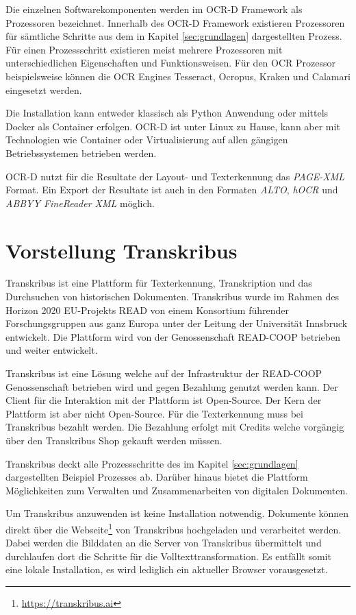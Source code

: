 \documentclass[a4paper,oneside, 12pt]{report}
\begin{document}
 Die einzelnen Softwarekomponenten werden im OCR-D Framework als Prozessoren bezeichnet. Innerhalb des OCR-D Framework existieren Prozessoren für sämtliche Schritte aus dem in Kapitel \ref{sec:grundlagen} dargestellten Prozess. Für einen Prozessschritt existieren meist mehrere Prozessoren mit unterschiedlichen Eigenschaften und Funktionsweisen. Für den \ac{OCR} Prozessor beispielsweise können die OCR Engines Tesseract, Ocropus, Kraken und Calamari eingesetzt werden. 

Die Installation kann entweder klassisch als Python Anwendung oder mittels Docker als Container erfolgen. OCR-D ist unter Linux zu Hause, kann aber mit Technologien wie Container oder Virtualisierung auf allen gängigen Betriebssystemen betrieben werden. \cite{ocrdsetup}

OCR-D nutzt für die Resultate der Layout- und Texterkennung das \textit{PAGE-XML} Format. Ein Export der Resultate ist auch in den Formaten \textit{ALTO}, \textit{hOCR} und \textit{ABBYY FineReader XML} möglich. \cite{ocrdfaq}


\section{Vorstellung Transkribus}
Transkribus ist eine Plattform für Texterkennung, Transkription und das Durchsuchen von historischen Dokumenten. Transkribus wurde im Rahmen des Horizon 2020 EU-Projekts READ von einem Konsortium führender Forschungsgruppen aus ganz Europa unter der Leitung der Universität Innsbruck entwickelt. Die Plattform wird von der Genossenschaft READ-COOP betrieben und weiter entwickelt. \cite{readcoopabout} 

Transkribus ist eine Lösung welche auf der Infrastruktur der READ-COOP Genossenschaft betrieben wird und gegen Bezahlung genutzt werden kann. Der Client für die Interaktion mit der Plattform ist Open-Source. Der Kern der Plattform ist aber nicht Open-Source. Für die Texterkennung muss bei Transkribus bezahlt werden. Die Bezahlung erfolgt mit Credits welche vorgängig über den Transkribus Shop gekauft werden müssen. \cite{transkribuspricing}

Transkribus deckt alle Prozessschritte des im Kapitel \ref{sec:grundlagen} dargestellten Beispiel Prozesses ab. Darüber hinaus bietet die Plattform Möglichkeiten zum Verwalten und Zusammenarbeiten von digitalen Dokumenten. \cite{transkribus}

Um Transkribus anzuwenden ist keine Installation notwendig. Dokumente können direkt über die Webseite\footnote{\url{https://transkribus.ai}} von Transkribus hochgeladen und verarbeitet werden. Dabei werden die Bilddaten an die Server von Transkribus übermittelt und durchlaufen dort die Schritte für die Volltexttransformation. Es entfällt somit eine lokale Installation, es wird lediglich ein aktueller Browser vorausgesetzt. 
\end{document}
